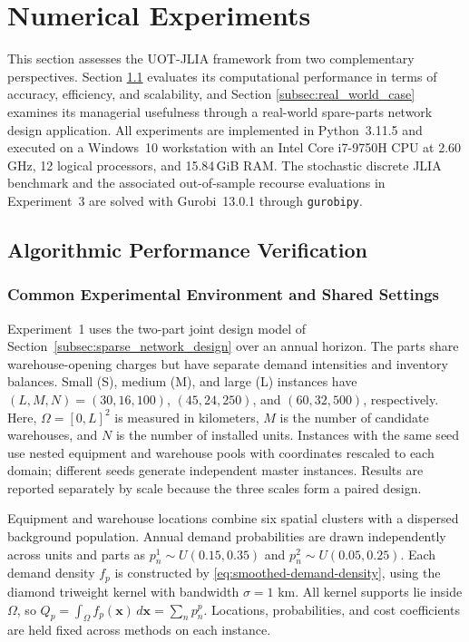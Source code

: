 \documentclass[a4paper,fleqn]{cas-sc}
\theoremstyle{remark}
\theoremstyle{plain}
\begin{document}
\section{Numerical Experiments}\label{sec:experiments}

This section assesses the UOT-JLIA framework from two complementary perspectives. Section \ref{subsec:algo-verification} evaluates its computational performance in terms of accuracy, efficiency, and scalability, and Section \ref{subsec:real_world_case} examines its managerial usefulness through a real-world spare-parts network design application. All experiments are implemented in Python~3.11.5 and executed on a Windows~10 workstation with an Intel Core i7-9750H CPU at 2.60\,GHz, 12 logical processors, and 15.84\,GiB RAM. The stochastic discrete JLIA benchmark and the associated out-of-sample recourse evaluations in Experiment~3 are solved with Gurobi~13.0.1 through \texttt{gurobipy}.

\subsection{Algorithmic Performance Verification}\label{subsec:algo-verification}

\subsubsection*{Common Experimental Environment and Shared Settings}

Experiment~1 uses the two-part joint design model of Section~\ref{subsec:sparse_network_design} over an annual horizon. The parts share warehouse-opening charges but have separate demand intensities and inventory balances. Small (S), medium (M), and large (L) instances have $(L,M,N)=(30,16,100)$, $(45,24,250)$, and $(60,32,500)$, respectively. Here, $\Omega=[0,L]^2$ is measured in kilometers, $M$ is the number of candidate warehouses, and $N$ is the number of installed units. Instances with the same seed use nested equipment and warehouse pools with coordinates rescaled to each domain; different seeds generate independent master instances. Results are reported separately by scale because the three scales form a paired design.

Equipment and warehouse locations combine six spatial clusters with a dispersed background population. Annual demand probabilities are drawn independently across units and parts as $p_n^1\sim U(0.15,0.35)$ and $p_n^2\sim U(0.05,0.25)$. Each demand density $f_p$ is constructed by \eqref{eq:smoothed-demand-density}, using the diamond triweight kernel with bandwidth $\sigma=1$ km. All kernel supports lie inside $\Omega$, so $Q_p=\int_\Omega f_p(\bm x)\,d\bm x=\sum_n p_n^p$. Locations, probabilities, and cost coefficients are held fixed across methods on each instance.
\end{document}
